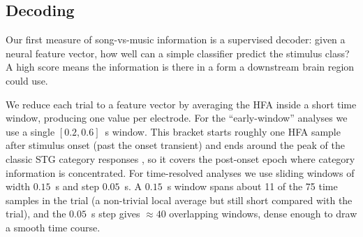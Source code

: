 \documentclass[11pt]{article}
\begin{document}
\begin{table}[t]
\centering
{\footnotesize
\noindent{}}
\caption{Roadmap linking research questions to analyses.}
\label{tab:methods-roadmap}
\end{table}

\subsection{Decoding}
Our first measure of song-vs-music information is a supervised decoder: given a neural feature vector, how well can a simple classifier predict the stimulus class? A high score means the information is there in a form a downstream brain region could use.

We reduce each trial to a feature vector by averaging the HFA inside a short time window, producing one value per electrode. For the ``early-window'' analyses we use a single $[0.2, 0.6]$~s window. This bracket starts roughly one HFA sample after stimulus onset (past the onset transient) and ends around the peak of the classic STG category responses \citep{NormanHaignere2022,Hamilton2018}, so it covers the post-onset epoch where category information is concentrated. For time-resolved analyses we use sliding windows of width $0.15$~s and step $0.05$~s. A $0.15$~s window spans about 11 of the 75 time samples in the trial (a non-trivial local average but still short compared with the trial), and the $0.05$~s step gives $\approx 40$ overlapping windows, dense enough to draw a smooth time course.
\end{document}
